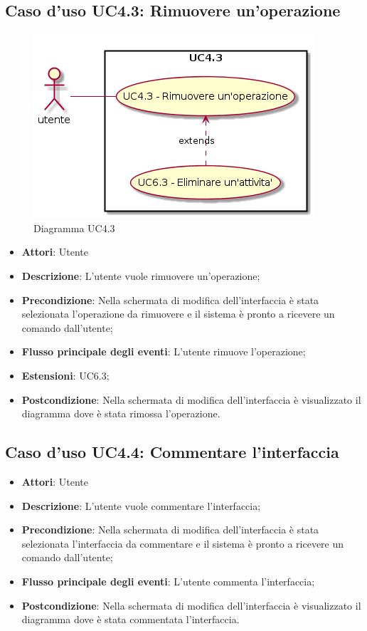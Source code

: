 \documentclass[../AnalisiDeiRequisiti.tex]{subfiles}
\begin{document}
			\subsection{Caso d'uso UC4.3: Rimuovere un'operazione}
			\begin{figure} [H]
				\centering
				\includegraphics[scale=0.45]{./Figures/UC4_3.png}
				\caption{Diagramma UC4.3}\label{}
			\end{figure}
			\begin{itemize}
				\item \textbf{Attori}: Utente
				\item \textbf{Descrizione}: L'utente vuole rimuovere un'operazione;
				\item \textbf{Precondizione}: Nella schermata di modifica dell'interfaccia è stata selezionata l'operazione da rimuovere e il sistema è pronto a ricevere un comando dall'utente;
				\item \textbf{Flusso principale degli eventi}: L'utente rimuove l'operazione;
				\item \textbf{Estensioni}: UC6.3;
				\item \textbf{Postcondizione}: Nella schermata di modifica dell'interfaccia è visualizzato il diagramma dove è stata rimossa l'operazione.
			\end{itemize}
			\subsection{Caso d'uso UC4.4: Commentare l'interfaccia}
			\begin{itemize}
				\item \textbf{Attori}: Utente
				\item \textbf{Descrizione}: L'utente vuole commentare l'interfaccia;
				\item \textbf{Precondizione}: Nella schermata di modifica dell'interfaccia è stata selezionata l'interfaccia da commentare e il sistema è pronto a ricevere un comando dall'utente;
				\item \textbf{Flusso principale degli eventi}: L'utente commenta l'interfaccia;
				\item \textbf{Postcondizione}: Nella schermata di modifica dell'interfaccia è visualizzato il diagramma dove è stata commentata l'interfaccia.
			\end{itemize}
\end{document}
